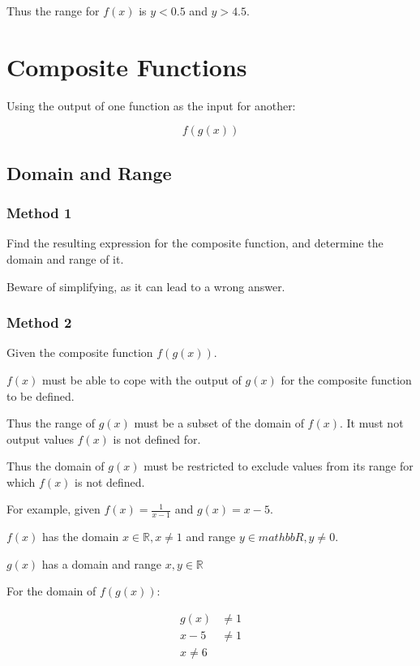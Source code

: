 \documentclass[a4paper,11pt]{article}
\begin{document}
Thus the range for $f(x)$ is $y < 0.5$ and $y > 4.5$.


\section{Composite Functions}

Using the output of one function as the input for another:

$$
f(g(x))
$$


\subsection{Domain and Range}

\subsubsection{Method 1}

Find the resulting expression for the composite function, and determine the
domain and range of it.

Beware of simplifying, as it can lead to a wrong answer.


\subsubsection{Method 2}

Given the composite function $f(g(x))$.

$f(x)$ must be able to cope with the output of $g(x)$ for the composite
function to be defined.

Thus the range of $g(x)$ must be a subset of the domain of $f(x)$. It must not
output values $f(x)$ is not defined for.

Thus the domain of $g(x)$ must be restricted to exclude values from its range
for which $f(x)$ is not defined.

For example, given $f(x) = \frac{1}{x - 1}$ and $g(x) = x - 5$.

$f(x)$ has the domain $x \in \mathbb{R}, x \neq 1$ and range
$y \in mathbb{R}, y \neq 0$.

$g(x)$ has a domain and range $x, y \in \mathbb{R}$

For the domain of $f(g(x))$:

$$
\begin{aligned}
g(x) & \neq 1 \\
x - 5 & \neq 1 \\
x \neq 6 \\
\end{aligned}
$$
\end{document}
